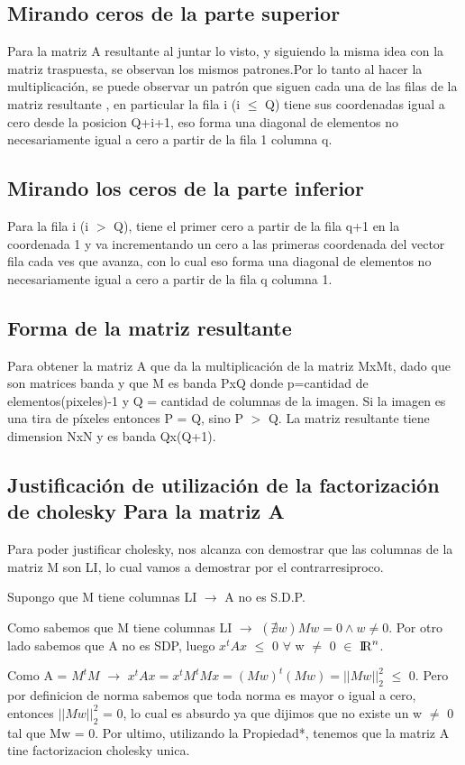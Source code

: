 \subsection{Mirando ceros de la parte superior} 
Para la matriz A resultante al juntar lo visto, y siguiendo la misma idea con la matriz traspuesta, se observan los mismos patrones.Por lo tanto al hacer la multiplicación, se puede observar un patrón que siguen cada una de las filas de la matriz resultante , en particular la fila i (i $\leq$ Q) tiene sus coordenadas igual a cero desde la posicion Q+i+1, eso forma una diagonal de elementos no necesariamente igual a cero a partir de la fila 1 columna q.

\subsection{Mirando los ceros de la parte inferior} 
Para la fila i (i $>$ Q), tiene el primer cero a partir de la fila q+1 en la coordenada 1  y va incrementando un cero a las primeras coordenada del vector fila cada ves que avanza, con lo cual eso forma una diagonal de elementos no necesariamente igual a cero a partir de la fila q columna 1.

\subsection{Forma de la matriz resultante}
Para obtener la matriz A que da la multiplicación de la matriz MxMt, dado que son matrices banda y que M es banda PxQ donde p=cantidad de elementos(pixeles)-1 y Q = cantidad de columnas de la imagen. Si la imagen es una tira de píxeles entonces P = Q, sino P $>$ Q.
La matriz resultante tiene dimension NxN y es banda Qx(Q+1). 

\subsection{Justificación de utilización de la factorización de cholesky Para la matriz A}

Para poder justificar cholesky, nos alcanza con demostrar que las columnas de la matriz M son LI, lo cual vamos a demostrar por el contrarresiproco.\par
\indent Supongo que M tiene columnas LI $\rightarrow$ A no es S.D.P. \par 
\indent Como sabemos que M tiene columnas LI $\rightarrow$ $(\nexists w ) Mw = 0 \land w \neq 0 $. Por otro lado sabemos que A no es SDP, luego $x^{t}Ax$ $\leq$ 0 $\forall$ w $\neq$ 0 $\in$ ${\rm I\!R}^{n}$.\par Como A = $M^{t}M$ $\rightarrow$ $x^{t}Ax = x^{t}M^{t}Mx = (Mw)^{t}(Mw) = ||Mw||_{2}^{2}$ $\leq$ 0. Pero por definicion de norma sabemos que toda norma es mayor o igual a cero, entonces $||Mw||_{2}^{2}$ = 0, lo cual es absurdo ya que dijimos que no existe un w $\neq$ 0 tal que Mw = 0. Por ultimo, utilizando la Propiedad*, tenemos que la matriz A tine factorizacion cholesky unica.


